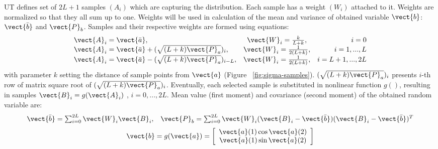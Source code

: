 UT defines set of $2L+1$ samples $(A_{i})$ which are capturing the distribution. Each sample has a weight $(W_{i})$ attached to it. Weights are normalized so that they all sum up to one. Weights will be used in calculation of the mean and variance of obtained variable $\vect{b}$: $\vect{\bar{b}}$ and $\vect{P}_{b}$. Samples and their respective weights are formed using equations:
\begin{eqnarray}
\begin{array}{l c r}
\vect{A}_{i} = \vect{\bar{a}}, & \vect{W}_{i} = \frac{k}{L+k}, & i = 0 \\
\vect{A}_{i} = \vect{\bar{a}}+(\sqrt{(L+k)\vect{P}_{a}})_{i}, & \vect{W}_{i} = \frac{1}{2(L+k)}, & i = 1,...,L \\
\vect{A}_{i} = \vect{\bar{a}}-(\sqrt{(L+k)\vect{P}_{a}})_{i-L}, & \vect{W}_{i} = \frac{1}{2(L+k)}, & i = L+1,...,2L \\
\end{array}
\label{eq:ut-sampling}
\end{eqnarray}
with parameter $k$ setting the distance of sample points from $\vect{a}$ (Figure ~\ref{fig:sigma-samples}). $(\sqrt{(L+k)\vect{P}_{a}})_{i}$ presents $i$-th row of matrix square root of $(\sqrt{(L+k)\vect{P}_{a}})_{i}$. Eventually, each selected sample is substituted in nonlinear function $g()$, resulting in samples $\vect{B}_{i} = g(\vect{A}_{i})$ , $i = 0 ,..., 2L$. Mean value (first moment) and covariance (second moment) of the obtained random variable are:
\begin{equation}
\begin{array}{l r}
\vect{\bar{b}} = \sum_{i=0}^{2L} \vect{W}_{i} \vect{B}_{i},   &
\vect{P}_{b} = \sum_{i=0}^{2L} \vect{W}_{i} (\vect{B}_{i} - \vect{\bar{b}}) (\vect{B}_{i} - \vect{\bar{b}})^{T}
\end{array}
\label{eq:ut-estimate}
\end{equation}
\begin{equation}
\vect{b} = g(\vect{a}) = \left[ \begin{array}{c} \vect{a}(1) \cos \vect{a}(2) \\ \vect{a}(1) \sin \vect{a}(2) \end{array} \right]
\label{eq:2cart}
\end{equation}
